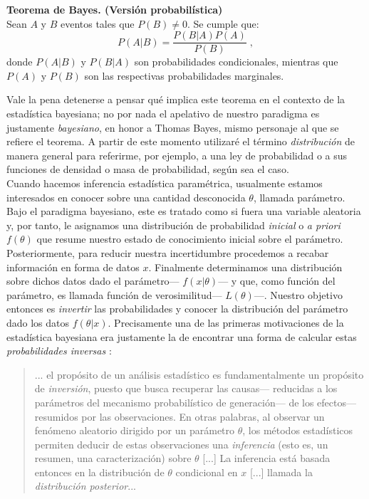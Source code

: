 \begin{teo} \label{teo:Bayes_1}
\textbf{Teorema de Bayes. (Versión probabilística)}\\
Sean $A$ y $B$ eventos tales que $P(B) \neq 0$. Se cumple que: 
\begin{equation*}
P(A|B)=\dfrac{P(B|A)P(A)}{P(B)}\;,
\end{equation*}
donde $P(A|B)$ y $P(B|A)$ son probabilidades condicionales, mientras que $P(A)$ y $P(B)$ son las respectivas probabilidades marginales. 
\end{teo}

Vale la pena detenerse a pensar qué implica este teorema en el contexto de la estadística bayesiana; no por nada el apelativo de nuestro paradigma es justamente \textit{bayesiano}, en honor a Thomas Bayes, mismo personaje al que se refiere el teorema. A partir de este momento utilizaré el término \textit{distribución} de manera general para referirme, por ejemplo, a una ley de probabilidad o a sus funciones de densidad o masa de probabilidad, según sea el caso.\\ 

Cuando hacemos inferencia estadística paramétrica, usualmente estamos interesados en conocer sobre una cantidad desconocida $\theta$, llamada parámetro. Bajo el paradigma bayesiano, este es tratado como si fuera una variable aleatoria y, por tanto, le asignamos una  distribución de probabilidad \textit{inicial} o \textit{a priori} $f(\theta)$ que resume nuestro estado de conocimiento inicial sobre el parámetro. Posteriormente, para reducir nuestra incertidumbre procedemos a recabar información en forma de datos $x$. Finalmente determinamos una distribución sobre dichos datos dado el parámetro--- $f(x|\theta)$--- y que, como función del parámetro, es llamada función de verosimilitud--- $L(\theta)$---. Nuestro objetivo entonces es \textit{invertir} las probabilidades y conocer la distribución del parámetro dado los datos $f(\theta|x)$. Precisamente una de las primeras motivaciones de la estadística bayesiana era justamente la de encontrar una forma de calcular estas \textit{probabilidades inversas} \citep{Robert07}: 
\begin{quote}
... el propósito de un análisis estadístico es fundamentalmente un propósito de \textit{inversión}, puesto que busca recuperar las causas--- reducidas a los parámetros del mecanismo probabilístico de generación--- de los efectos--- resumidos por las observaciones. En otras palabras, al observar un fenómeno aleatorio dirigido por un parámetro $\theta$, los métodos estadísticos permiten deducir de estas observaciones una \textit{inferencia} (esto es, un resumen, una caracterización) sobre $\theta$ [...] La inferencia está basada entonces en la distribución de $\theta$ condicional en $x$ [...] llamada la \textit{distribución posterior}...
\end{quote} 

